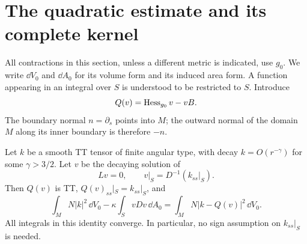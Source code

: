 \section{The quadratic estimate and its complete kernel}
\label{ads:sec:quadratic}

All contractions in this section, unless a different metric is indicated, use
$g_0$.  We write $\dd V_0$ and $\dd A_0$ for its volume form and its induced
area form.  A function appearing in an integral over $S$ is understood to be
restricted to $S$.  Introduce
\[
 Q(v)=\operatorname{Hess}_{g_0}v-vB.
\]
The boundary normal $n=\partial_s$ points into $M$; the outward normal of
the domain $M$ along its inner boundary is therefore $-n$.

\begin{lemma}
\label{ads:lem:tt-square}
Let $k$ be a smooth TT tensor of finite angular type, with decay
$k=O(r^{-\gamma})$ for some $\gamma>3/2$.  Let $v$ be the decaying solution of
\begin{equation}
 Lv=0,
 \qquad v|_S=D^{-1}(k_{ss}|_S).
 \label{ads:eq:tt-dirichlet}
\end{equation}
Then $Q(v)$ is TT, $Q(v)_{ss}|_S=k_{ss}|_S$, and
\begin{equation}
 \int_M N|k|^2\,\dd V_0
 -\kappa\int_S vDv\,\dd A_0
 =\int_M N|k-Q(v)|^2\,\dd V_0.
 \label{ads:eq:tt-square}
\end{equation}
All integrals in this identity converge.  In particular, no sign assumption
on $k_{ss}|_S$ is needed.
\end{lemma}

